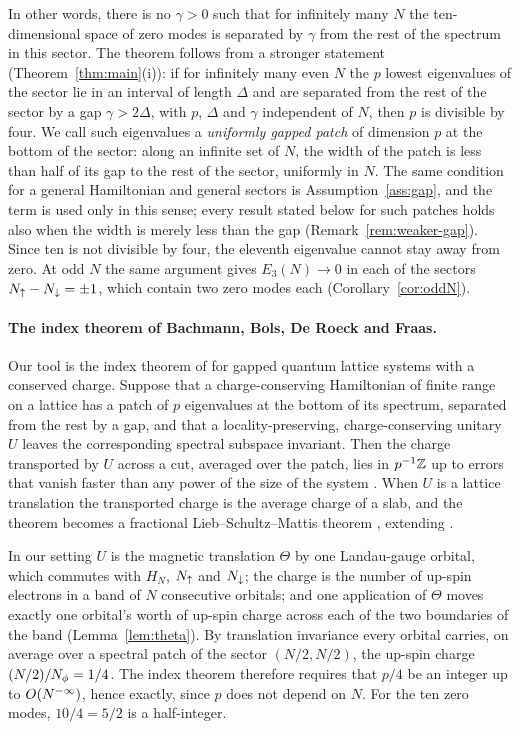 In other words, there is no $\gamma>0$ such that for infinitely many $N$ the ten-dimensional space of zero
modes is separated by $\gamma$ from the rest of the spectrum in this sector. The theorem follows from a
stronger statement (Theorem~\ref{thm:main}(i)): if for infinitely many even $N$ the $p$ lowest eigenvalues
of the sector lie in an interval of length $\Delta$ and are separated from the rest of the sector by a gap
$\gamma>2\Delta$, with $p$, $\Delta$ and $\gamma$ independent of $N$, then $p$ is divisible by four. We call
such eigenvalues a \emph{uniformly gapped patch} of dimension $p$ at the bottom of the sector: along an infinite
set of $N$, the width of the patch is less than half of its gap to the rest of the sector, uniformly in $N$. The
same condition for a general Hamiltonian and general sectors is Assumption~\ref{ass:gap}, and the term is used
only in this sense; every result stated below for such patches holds also when the width is merely less than the gap
(Remark~\ref{rem:weaker-gap}). Since ten is not divisible by four, the eleventh eigenvalue cannot stay away from zero. At
odd $N$ the same argument gives
$E_3(N)\to0$ in each of the sectors $N_{\uparrow}-N_{\downarrow}=\pm1$, which contain two zero modes each
(Corollary~\ref{cor:oddN}).

\paragraph{The index theorem of Bachmann, Bols, De Roeck and Fraas.}
Our tool is the index theorem of \cite{BBDF21} for gapped quantum lattice systems with a conserved charge.
Suppose that a charge-conserving Hamiltonian of finite range on a lattice has a patch of $p$ eigenvalues at
the bottom of its spectrum, separated from the rest by a gap, and that a locality-preserving,
charge-conserving unitary $U$ leaves the corresponding spectral subspace invariant. Then the charge
transported by $U$ across a cut, averaged over the patch, lies in $p^{-1}\mathbb{Z}$ up to errors that vanish faster
than any power of the size of the system \cite[Theorem~3.2]{BBDF21}. When $U$ is a lattice translation the
transported charge is the average charge of a slab, and the theorem becomes a fractional
Lieb--Schultz--Mattis theorem \cite[Corollary~5.2]{BBDF21}, extending \cite{LSM61,Osh00,Has04,NS07}.

In our setting $U$ is the magnetic translation $\Theta$ by one Landau-gauge orbital, which commutes with
$H_N$, $N_{\uparrow}$ and $N_{\downarrow}$; the charge is the number of up-spin electrons in a band of $N$ consecutive
orbitals; and one application of $\Theta$ moves exactly one orbital's worth of up-spin charge across each of
the two boundaries of the band (Lemma~\ref{lem:theta}). By translation invariance every orbital carries, on
average over a spectral patch of the sector $(N/2,N/2)$, the up-spin charge $(N/2)/N_{\phi}=1/4$. The index
theorem therefore requires that $p/4$ be an integer up to $O(N^{-\infty})$, hence exactly, since $p$ does not depend
on $N$. For the ten zero modes, $10/4=5/2$ is a half-integer.


